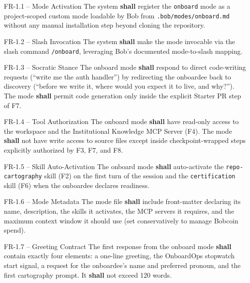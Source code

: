 \documentclass[11pt,letterpaper]{article}
\newcommand{\shall}{\textbf{shall}}
\begin{document}
\begin{reqbox}{FR-1.1 -- Mode Activation}
The system \shall{} register the \texttt{onboard} mode as a project-scoped custom mode loadable by Bob from \texttt{.bob/modes/onboard.md} without any manual installation step beyond cloning the repository.
\end{reqbox}

\begin{reqbox}{FR-1.2 -- Slash Invocation}
The system \shall{} make the mode invocable via the slash command \texttt{/onboard}, leveraging Bob's documented mode-to-slash mapping.
\end{reqbox}

\begin{reqbox}{FR-1.3 -- Socratic Stance}
The onboard mode \shall{} respond to direct code-writing requests (``write me the auth handler'') by redirecting the onboardee back to discovery (``before we write it, where would you expect it to live, and why?''). The mode \shall{} permit code generation only inside the explicit Starter PR step of F7.
\end{reqbox}

\begin{reqbox}{FR-1.4 -- Tool Authorization}
The onboard mode \shall{} have read-only access to the workspace and the Institutional Knowledge MCP Server (F4). The mode \shall{} not have write access to source files except inside checkpoint-wrapped steps explicitly authorized by F3, F7, and F8.
\end{reqbox}

\begin{reqbox}{FR-1.5 -- Skill Auto-Activation}
The onboard mode \shall{} auto-activate the \texttt{repo-cartography} skill (F2) on the first turn of the session and the \texttt{certification} skill (F6) when the onboardee declares readiness.
\end{reqbox}

\begin{reqbox}{FR-1.6 -- Mode Metadata}
The mode file \shall{} include front-matter declaring its name, description, the skills it activates, the MCP servers it requires, and the maximum context window it should use (set conservatively to manage Bobcoin spend).
\end{reqbox}

\begin{reqbox}{FR-1.7 -- Greeting Contract}
The first response from the onboard mode \shall{} contain exactly four elements: a one-line greeting, the OnboardOps stopwatch start signal, a request for the onboardee's name and preferred pronoun, and the first cartography prompt. It \shall{} not exceed 120 words.
\end{reqbox}
\end{document}
